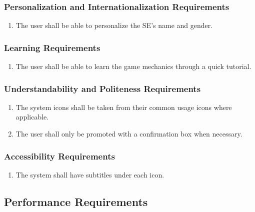 \documentclass[]{article}
\begin{document}
\subsubsection{Personalization and Internationalization Requirements}
\label{ssub:personalization_and_internationalization_requirements}
\begin{enumerate}[start=3, label={UH\arabic*.}]
	\item The user shall be able to personalize the SE’s name and gender.
\end{enumerate}

\subsubsection{Learning Requirements}
\label{ssub:learning_requirements}
\begin{enumerate}[start=4, label={UH\arabic*.}]
    \item The user shall be able to learn the game mechanics through a quick 
    tutorial.
\end{enumerate}

\subsubsection{Understandability and Politeness Requirements}
\label{ssub:understandability_and_politeness_requirements}
\begin{enumerate}[start=5, label={UH\arabic*.}]
    \item The system icons shall be taken from their common usage icons where 
    applicable. 
    \item The user shall only be promoted with a confirmation box when necessary.
\end{enumerate}

\subsubsection{Accessibility Requirements}
\label{ssub:accessibility_requirements}
\begin{enumerate}[start=7, label={UH\arabic*.}]
	\item The system shall have subtitles under each icon.
\end{enumerate}

\subsection{Performance Requirements}
\label{sub:performance_requirements}
\end{document}
